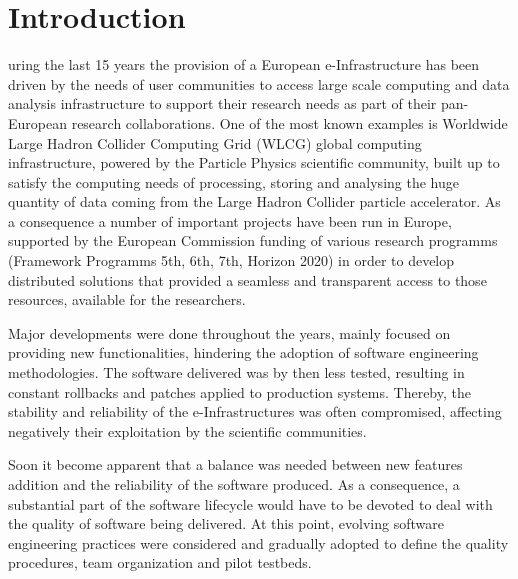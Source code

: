 \documentclass[journal]{IEEEtran}
\begin{document}
\IEEEpeerreviewmaketitle

\section{Introduction}



uring the last 15 years the provision of a European e-Infrastructure has been driven by the 
needs of user communities to access large scale computing and data analysis infrastructure to 
support their research needs as part of their pan-European research collaborations. One of the most 
known examples is Worldwide Large Hadron Collider Computing Grid (WLCG) global computing infrastructure, 
powered by the Particle Physics scientific community, built up to satisfy the computing needs
of processing, storing and analysing the huge quantity of data coming from the Large Hadron
Collider particle accelerator. As a consequence a number of important projects have been run in Europe, supported by the European Commission funding of various research programms (Framework Programms 5th, 6th, 7th, Horizon 2020) in order to
develop distributed solutions that provided a seamless and transparent access to those resources, available for the researchers.

Major developments were done throughout the years, mainly focused on providing new
functionalities, hindering the adoption of software engineering methodologies.
The software delivered was by then less tested, resulting in constant
rollbacks and patches applied to production systems. Thereby, the stability and
reliability of the e-Infrastructures was often compromised, affecting
negatively their exploitation by the scientific communities.

Soon it become apparent that a balance was needed between new features addition
and the reliability of the software produced. As a consequence, a substantial part of the
software lifecycle would have to be devoted to deal with the quality of software being
delivered. At this point, evolving software engineering practices were
considered and gradually adopted to define the quality procedures, team
organization and pilot testbeds.
\end{document}
